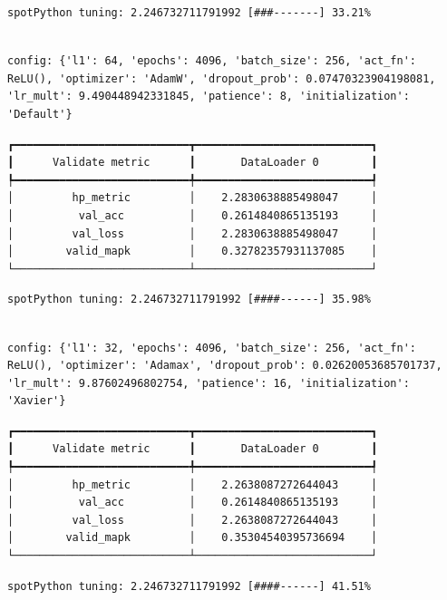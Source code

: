 \documentclass[
  letterpaper,
  DIV=11,
  numbers=noendperiod]{scrreprt}
\begin{document}
\begin{verbatim}
spotPython tuning: 2.246732711791992 [###-------] 33.21% 
\end{verbatim}

\begin{verbatim}

config: {'l1': 64, 'epochs': 4096, 'batch_size': 256, 'act_fn': ReLU(), 'optimizer': 'AdamW', 'dropout_prob': 0.07470323904198081, 'lr_mult': 9.490448942331845, 'patience': 8, 'initialization': 'Default'}
\end{verbatim}

\begin{verbatim}
┏━━━━━━━━━━━━━━━━━━━━━━━━━━━┳━━━━━━━━━━━━━━━━━━━━━━━━━━━┓
┃      Validate metric      ┃       DataLoader 0        ┃
┡━━━━━━━━━━━━━━━━━━━━━━━━━━━╇━━━━━━━━━━━━━━━━━━━━━━━━━━━┩
│         hp_metric         │    2.2830638885498047     │
│          val_acc          │    0.2614840865135193     │
│         val_loss          │    2.2830638885498047     │
│        valid_mapk         │    0.32782357931137085    │
└───────────────────────────┴───────────────────────────┘
\end{verbatim}

\begin{verbatim}
spotPython tuning: 2.246732711791992 [####------] 35.98% 
\end{verbatim}

\begin{verbatim}

config: {'l1': 32, 'epochs': 4096, 'batch_size': 256, 'act_fn': ReLU(), 'optimizer': 'Adamax', 'dropout_prob': 0.02620053685701737, 'lr_mult': 9.87602496802754, 'patience': 16, 'initialization': 'Xavier'}
\end{verbatim}

\begin{verbatim}
┏━━━━━━━━━━━━━━━━━━━━━━━━━━━┳━━━━━━━━━━━━━━━━━━━━━━━━━━━┓
┃      Validate metric      ┃       DataLoader 0        ┃
┡━━━━━━━━━━━━━━━━━━━━━━━━━━━╇━━━━━━━━━━━━━━━━━━━━━━━━━━━┩
│         hp_metric         │    2.2638087272644043     │
│          val_acc          │    0.2614840865135193     │
│         val_loss          │    2.2638087272644043     │
│        valid_mapk         │    0.35304540395736694    │
└───────────────────────────┴───────────────────────────┘
\end{verbatim}

\begin{verbatim}
spotPython tuning: 2.246732711791992 [####------] 41.51% 
\end{verbatim}
\end{document}
